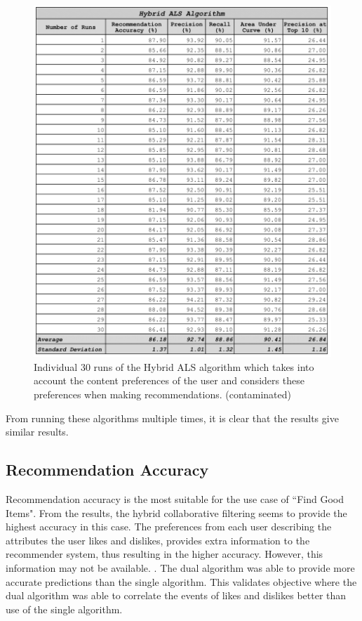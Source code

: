 \begin{figure}
\centering
\includegraphics[scale=0.3]{images/hybrid_als_30_runs.png}
\caption{Individual 30 runs of the Hybrid ALS algorithm which takes into account the content preferences of the user and considers these preferences when making recommendations. (contaminated)}
\label{fig:dual_algorithm}
\end{figure}

From running these algorithms multiple times, it is clear that the results give similar results. 

\subsection{Recommendation Accuracy}
Recommendation accuracy is the most suitable for the use case of ``Find Good Items". From the results, the hybrid collaborative filtering seems to provide the highest accuracy in this case. The preferences from each user describing the attributes the user likes and dislikes, provides extra information to the recommender system, thus resulting in the higher accuracy. However, this information may not be available. . The dual algorithm was able to provide more accurate predictions than the single algorithm. This validates objective  where the dual algorithm was able to correlate the events of likes and dislikes better than use of the single algorithm.

